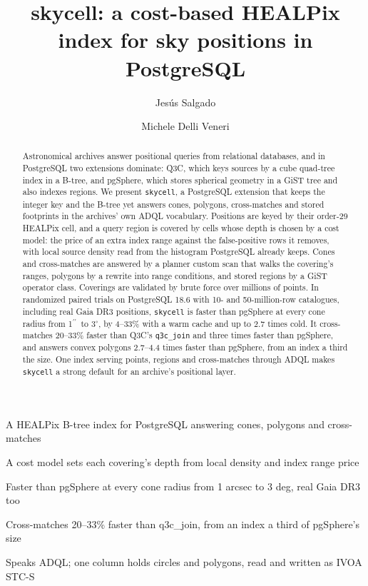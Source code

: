 \documentclass[final,5p,times,twocolumn,authoryear]{elsarticle}
\newcommand{\arcsec}{\ensuremath{^{\prime\prime}}}
\newcommand{\degr}{\ensuremath{^{\circ}}}
\begin{document}
\begin{frontmatter}

\title{skycell: a cost-based HEALPix index for sky positions in PostgreSQL}

\author[skao]{Jes\'us Salgado}
\author[skao]{Michele Delli Veneri}

\begin{abstract}
Astronomical archives answer positional queries from relational databases, and in
PostgreSQL two extensions dominate: Q3C, which keys sources by a cube quad-tree index in
a B-tree, and pgSphere, which stores spherical geometry in a GiST tree and also indexes
regions. We present \texttt{skycell}, a PostgreSQL extension that keeps the integer key
and the B-tree yet answers cones, polygons, cross-matches and stored footprints in the
archives' own ADQL vocabulary. Positions are keyed by their order-29 HEALPix cell, and a
query region is covered by cells whose depth is chosen by a cost model: the price of an
extra index range against the false-positive rows it removes, with local source density
read from the histogram PostgreSQL already keeps. Cones and cross-matches are answered by
a planner custom scan that walks the covering's ranges, polygons by a rewrite into range
conditions, and stored regions by a GiST operator class. Coverings are validated by
brute force over millions of points. In randomized paired trials on PostgreSQL 18.6 with
10- and 50-million-row catalogues, including real Gaia DR3 positions, \texttt{skycell}
is faster than pgSphere at every cone radius from 1\arcsec\ to 3\degr, by 4--33\% with a
warm cache and up to 2.7 times cold. It cross-matches 20--33\% faster than Q3C's
\texttt{q3c\_join} and three times faster than pgSphere, and answers convex polygons
2.7--4.4 times faster than pgSphere, from an index a third the size. One index serving
points, regions and cross-matches through ADQL makes \texttt{skycell} a strong default
for an archive's positional layer.
\end{abstract}

\begin{highlights}
\item A HEALPix B-tree index for PostgreSQL answering cones, polygons and cross-matches
\item A cost model sets each covering's depth from local density and index range price
\item Faster than pgSphere at every cone radius from 1 arcsec to 3 deg, real Gaia DR3 too
\item Cross-matches 20--33\% faster than q3c\_join, from an index a third of pgSphere's size
\item Speaks ADQL; one column holds circles and polygons, read and written as IVOA STC-S
\end{highlights}


\end{frontmatter}
\end{document}
